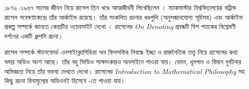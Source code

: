 \documentclass[../../../include/open-logic-section]{subfiles}
\begin{document}
\begin{reading}
১৮৭২--১৯৬৭ সালের জীবন নিয়ে রাসেল
তিন খণ্ডে আত্মজীবনী লিখেছিলেন
\citep{Russell1967,Russell1968,Russell1969}।
ম্যাকমাস্টার বিশ্ববিদ্যালয়ের বার্ট্রান্ড রাসেল
গবেষণাকেন্দ্রে তাঁর আর্কাইভ রয়েছে।
তাঁর সংকলিত রচনার খণ্ডগুলি (অনুসন্ধানযোগ্য
সূচিসহ) এবং আর্কাইভ প্রকল্প সম্পর্কে
জানতে কেন্দ্রটির ওয়েবসাইট দেখো
\citet{Duncan2015}। রাসেলের
\emph{On Denoting} প্রবন্ধটি
\citep{Russell1905} বিশ শতকের
বিশ্লেষণী দর্শনের একটি ধ্রুপদি রচনা।

রাসেল সম্পর্কে স্ট্যানফোর্ড এনসাইক্লোপিডিয়া
অব ফিলসফির নিবন্ধে \citep{Irvine2015}
ইচ্ছা ও রাজনৈতিক তত্ত্ব নিয়ে রাসেলের
কথা বলার অডিও অংশ আছে। তাঁর বহু
ভিডিও সাক্ষাৎকারও অনলাইনে পাওয়া যায়।
যেমন, ধূমপান ও বিমান দুর্ঘটনার অভিজ্ঞতা
নিয়ে তাঁর বক্তব্য দেখতে
\citet{RussellND} দেখো। রাসেলের
\emph{Introduction to Mathematical Philosophy}
সহ কিছু রচনা বিনামূল্যের অডিওবই হিসেবে
\citet{LibriVoxND}-তে পাওয়া যায়।
\end{reading}
\end{document}

